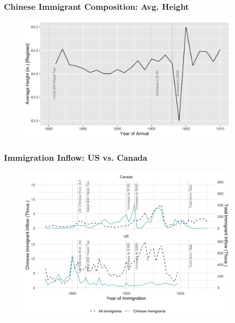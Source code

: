 \documentclass[pdf]{beamer}
\begin{document}
\begin{frame}[label = register_height]
	\frametitle{Chinese Immigrant Composition: Avg. Height}
    \centering
	\begin{figure}[H]
		\begin{center}
			\includegraphics[width=\textwidth]{../../figs/8aug23/register_height.png}
		\end{center}
	\end{figure}
    \hyperlink{register_regs}{}
\end{frame}

\begin{frame}[label = flow_us_can]
	\frametitle{Immigration Inflow: US vs. Canada}
    \centering
	\begin{figure}[H]
		\begin{center}
			\includegraphics[width=\textwidth]{../../figs/fig3_us_can.png}
		\end{center}
	\end{figure}
    \hyperlink{reg_us}{}
\end{frame}
\end{document}
